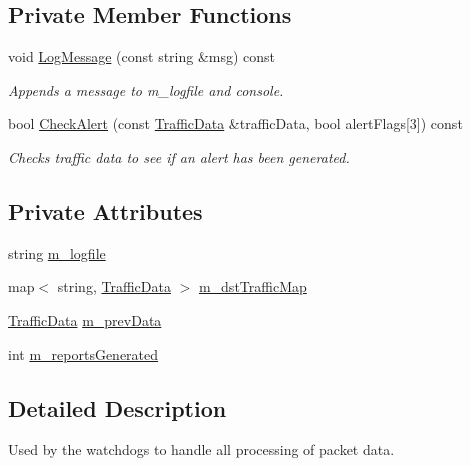 \subsection*{Private Member Functions}
\begin{DoxyCompactItemize}
\item 
void \hyperlink{classTrafficAnalyzer_afb932f1bf1ba2d94e8c69db63d126d61}{Log\-Message} (const string \&msg) const 
\begin{DoxyCompactList}\small\item\em Appends a message to m\-\_\-logfile and console. \end{DoxyCompactList}\item 
bool \hyperlink{classTrafficAnalyzer_ab9ff1c97d41edcaa638d3d4afb658f19}{Check\-Alert} (const \hyperlink{structTrafficAnalyzer_1_1TrafficData}{Traffic\-Data} \&traffic\-Data, bool alert\-Flags\mbox{[}3\mbox{]}) const 
\begin{DoxyCompactList}\small\item\em Checks traffic data to see if an alert has been generated. \end{DoxyCompactList}\end{DoxyCompactItemize}
\subsection*{Private Attributes}
\begin{DoxyCompactItemize}
\item 
string \hyperlink{classTrafficAnalyzer_add716c01da39c385a97a311b465deeb4}{m\-\_\-logfile}
\item 
map$<$ string, \hyperlink{structTrafficAnalyzer_1_1TrafficData}{Traffic\-Data} $>$ \hyperlink{classTrafficAnalyzer_aabed7c9e5a09fdddd78bbf797e267a2f}{m\-\_\-dst\-Traffic\-Map}
\item 
\hyperlink{structTrafficAnalyzer_1_1TrafficData}{Traffic\-Data} \hyperlink{classTrafficAnalyzer_a734268651e33bf00e26314039c7d2647}{m\-\_\-prev\-Data}
\item 
int \hyperlink{classTrafficAnalyzer_aedc4b5279b06fa8b9cefeedcbddcfb74}{m\-\_\-reports\-Generated}
\end{DoxyCompactItemize}


\subsection{Detailed Description}
Used by the watchdogs to handle all processing of packet data. 


